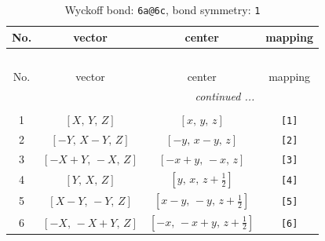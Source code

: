\documentclass[fleqn,8pt]{jsarticle}
\begin{document}
\begin{longtable}{cccc}
\caption{Wyckoff bond: {\tt 6a@6c}, bond symmetry: {\tt 1}}
 \\
 \hline \hline
No. & vector & center & mapping \\ \hline \endfirsthead

\multicolumn{3}{l}{\tablename\ \thetable{}} \\
 \hline \hline
No. & vector & center & mapping \\ \hline \endhead

 \hline \hline
\multicolumn{3}{r}{\footnotesize\it continued ...} \\ \endfoot

 \hline \hline
\multicolumn{3}{r}{} \\ \endlastfoot

1 & $\left[ X,\, Y,\, Z \right]$ & $\left[ x,\, y,\, z \right]$ & {\tt [1]} \\ \hline
2 & $\left[ - Y,\, X - Y,\, Z \right]$ & $\left[ - y,\, x - y,\, z \right]$ & {\tt [2]} \\ \hline
3 & $\left[ - X + Y,\, - X,\, Z \right]$ & $\left[ - x + y,\, - x,\, z \right]$ & {\tt [3]} \\ \hline
4 & $\left[ Y,\, X,\, Z \right]$ & $\left[ y,\, x,\, z + \frac{1}{2} \right]$ & {\tt [4]} \\ \hline
5 & $\left[ X - Y,\, - Y,\, Z \right]$ & $\left[ x - y,\, - y,\, z + \frac{1}{2} \right]$ & {\tt [5]} \\ \hline
6 & $\left[ - X,\, - X + Y,\, Z \right]$ & $\left[ - x,\, - x + y,\, z + \frac{1}{2} \right]$ & {\tt [6]} \\
\end{longtable}
\end{document}

